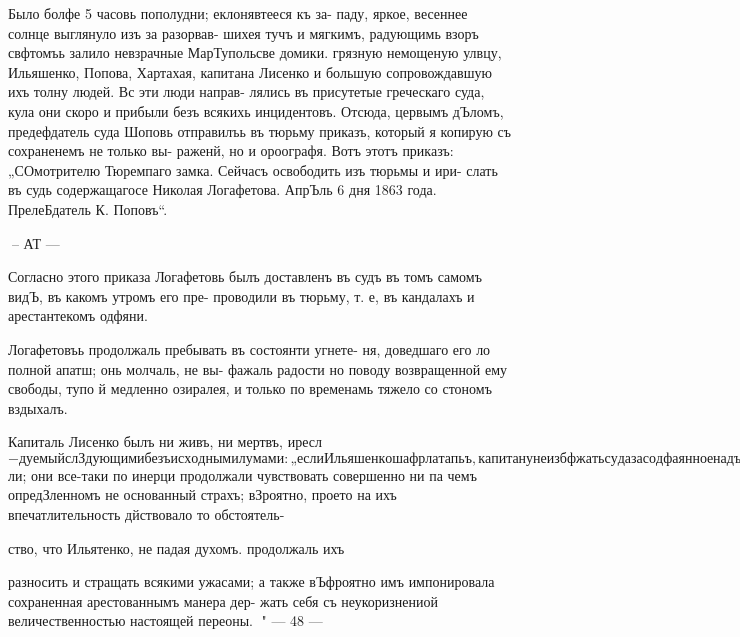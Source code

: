 Было болфе 5 часовь пополудни; еклонявтееся къ за-
паду, яркое, весеннее солнце выглянуло изъ за разорвав-
шихея тучъ и мягкимъ, радующимь взоръ свфтомъь залило
невзрачные МарТупольсве домики. грязную немощеную улвцу,
Ильяшенко, Попова, Хартахая, капитана Лисенко и большую
сопровождавшую ихъ толну людей. Вс эти люди направ-
лялись въ присутетые греческаго суда, кула они скоро
и прибыли безъ всякихь инцидентовъ. Отсюда, цервымъ
дЪломъ, предефдатель суда Шоповь отправилъь въ тюрьму
приказъ, который я копирую съ сохраненемъ не только вы-
раженй, но и ороографя. Вотъ этотъ приказъ: „СОмотрителю
Тюремпаго замка. Сейчасъ освободить изъ тюрьмы и ири-
слать въ судь содержащагосе Николая Логафетова. АпрЪль
6 дня 1863 года. ПрелеБдатель К. Поповъ“.

-- АТ —

Согласно этого приказа Логафетовь былъ доставленъ
въ судъ въ томъ самомъ видЪ, въ какомъ утромъ его пре-
проводили въ тюрьму, т. е, въ кандалахъ и арестантекомъ
одфяни.

Логафетовъь продолжаль пребывать въ состоянти угнете-
ня, доведшаго его ло полной апатш; онь молчаль, не вы-
фажаль радости но поводу возвращенной ему свободы, тупо
й медленно озиралея, и только по временамь тяжело со
стономъ вздыхалъ.

Капиталь Лисенко былъ ни живъ, ни мертвъ, иресл$-
дуемый слЗдующими безъисходными лумами: „если Ильяшенко
шафрлатапьъ, капитану не избфжать суда за содфаянное надъ
„Лотафетовымъ; если же Ильятенко таинственный и чрезвы-
чайный начальникъ, какъ въ этомъ онъ продолжаль упорно
увфрать, постоянно твердя: „попомните меня, никото не
забуду“... то совефмъ не трудно угодить въ каторгу, еели
не на зисфлицу“... .

Хартахай, предефхалель, засвдалель и ваводнивиие при-
сутстые суда именитые граждане пылали зл0б0й противъ
Ильяшенко, обиженные посмфян1емъ надъ ихъ роднымъ учреж-
дентемъ и наль вовми ими.

Снявъ съ Лотафетова арестантекое одзян1е, эти разсер-
женные люди со злобой одЪли въ него лжеуполномоченнаго.

Но заключить Ильяшенко въ кандалы греки не поем$ли;
они все-таки по инерци продолжали чувствовать совершенно
ни па чемъ опредЗленномъ не основанный страхъ; вЗроятно,
проето на ихъ впечатлительность дйствовало то обстоятель-

ство, что Ильятенко, не падая духомъ. продолжаль ихъ

разносить и стращать всякими ужасами; а также вЪфроятно
имъ импонировала сохраненная арестованнымъ манера дер-
жать себя съ неукоризнениой величественностью настоящей
переоны.
" — 48 —


